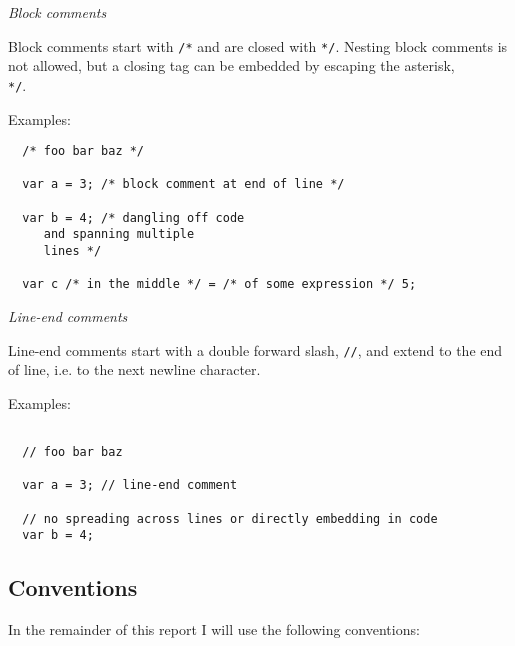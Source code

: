 \documentclass[11pt,a4paper]{article}
\begin{document}
\textit{Block comments}

Block comments start with \texttt{/*} and are closed with \texttt{*/}. Nesting
block comments is not allowed, but a closing tag can be embedded by escaping the
asterisk, \texttt{\\*/}.

Examples:

\begin{verbatim}
  /* foo bar baz */

  var a = 3; /* block comment at end of line */

  var b = 4; /* dangling off code
     and spanning multiple
     lines */

  var c /* in the middle */ = /* of some expression */ 5;

\end{verbatim}

\textit{Line-end comments}

Line-end comments start with a double forward slash, \texttt{//}, and extend to
the end of line, i.e. to the next newline character.

Examples:

\begin{verbatim}

  // foo bar baz
  
  var a = 3; // line-end comment

  // no spreading across lines or directly embedding in code
  var b = 4;

\end{verbatim}

\subsection{Conventions}

In the remainder of this report I will use the following conventions:
\end{document}
